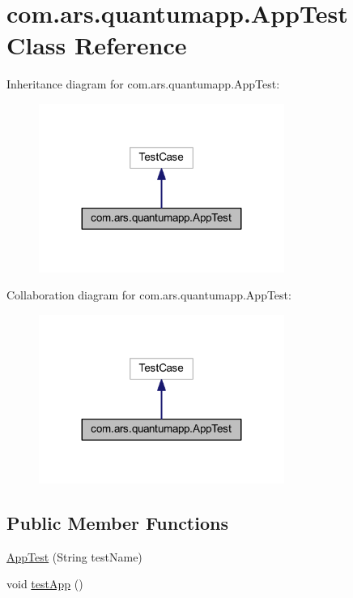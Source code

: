 \hypertarget{classcom_1_1ars_1_1quantumapp_1_1_app_test}{}\section{com.\+ars.\+quantumapp.\+App\+Test Class Reference}
\label{classcom_1_1ars_1_1quantumapp_1_1_app_test}


Inheritance diagram for com.\+ars.\+quantumapp.\+App\+Test\+:\nopagebreak
\begin{figure}[H]
\begin{center}
\leavevmode
\includegraphics[width=227pt]{classcom_1_1ars_1_1quantumapp_1_1_app_test__inherit__graph}
\end{center}
\end{figure}


Collaboration diagram for com.\+ars.\+quantumapp.\+App\+Test\+:\nopagebreak
\begin{figure}[H]
\begin{center}
\leavevmode
\includegraphics[width=227pt]{classcom_1_1ars_1_1quantumapp_1_1_app_test__coll__graph}
\end{center}
\end{figure}
\subsection*{Public Member Functions}
\begin{DoxyCompactItemize}
\item 
\hyperlink{classcom_1_1ars_1_1quantumapp_1_1_app_test_ad1892904405d218e652b29e79de2de1d}{App\+Test} (String test\+Name)
\item 
void \hyperlink{classcom_1_1ars_1_1quantumapp_1_1_app_test_a37866d2d52dc17cbba459bb947972bdd}{test\+App} ()
\end{DoxyCompactItemize}
